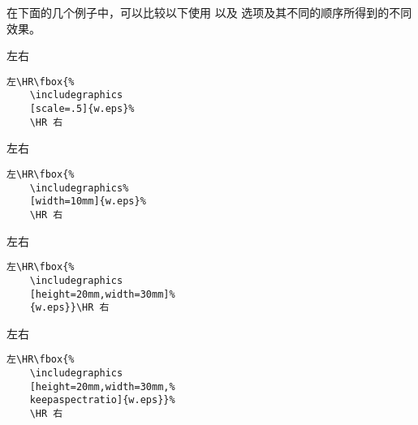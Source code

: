 在下面的几个例子中，可以比较以下使用  以及  选项及其不同的顺序所得到的不同效果。

\begin{minipage}[t]{.45\textwidth}
	\vspace{0pt}
	左\HR\fbox{%
		\texttt{[image: w]}}\HR 右
\end{minipage}%
\hspace{-.5cm}\begin{minipage}[t]{.5\textwidth}
	\vspace{0pt}
	\begin{Verbatim}[frame=lines,label=\colorbox{green}{\small 例一},labelposition=topline]
	左\HR\fbox{%
	\includegraphics
	[scale=.5]{w.eps}%
	\HR 右
	\end{Verbatim}
\end{minipage}

\begin{minipage}[c]{.45\textwidth}
	左\HR\fbox{%
		\texttt{[image: w]}}\HR 右
\end{minipage}%
\hspace{-.5cm}\begin{minipage}[c]{.5\textwidth}
	\begin{Verbatim}[frame=lines,label=\colorbox{green}{\small 例二},labelposition=topline]
	左\HR\fbox{%
	\includegraphics%
	[width=10mm]{w.eps}%
	\HR 右
	\end{Verbatim}
\end{minipage}

\begin{minipage}[c]{.45\textwidth}
	左\HR{}\HR 右
\end{minipage}%
\hspace{-.5cm}\begin{minipage}[c]{.5\textwidth}
	\begin{Verbatim}[frame=lines,label=\colorbox{green}{\small 例三},labelposition=topline]
	左\HR\fbox{%
	\includegraphics
	[height=20mm,width=30mm]%
	{w.eps}}\HR 右
	\end{Verbatim}
\end{minipage}

\begin{minipage}[c]{.45\textwidth}
	左\HR\fbox{%
		\texttt{[image: w]}}\HR 右
\end{minipage}%
\hspace{-.5cm}\begin{minipage}[c]{.5\textwidth}
	\begin{Verbatim}[frame=lines,label=\colorbox{green}{\small 例四},labelposition=topline]
	左\HR\fbox{%
	\includegraphics
	[height=20mm,width=30mm,%
	keepaspectratio]{w.eps}}%
	\HR 右
	\end{Verbatim}
\end{minipage}

